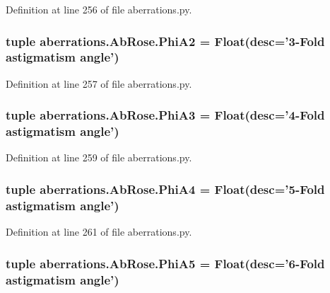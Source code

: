 Definition at line 256 of file aberrations.\-py.

\hypertarget{classaberrations_1_1_ab_rose_a69b11a8a41302834a847a94e4cd3c179}{
\subsubsection[{Phi\-A2}]{\setlength{\rightskip}{0pt plus 5cm}tuple aberrations.\-Ab\-Rose.\-Phi\-A2 = Float(desc='3-\/Fold astigmatism {\bf angle}')\hspace{0.3cm}{\ttfamily [static]}}}\label{classaberrations_1_1_ab_rose_a69b11a8a41302834a847a94e4cd3c179}


Definition at line 257 of file aberrations.\-py.

\hypertarget{classaberrations_1_1_ab_rose_a823c4123539f2644a44a89e11932c4d8}{
\subsubsection[{Phi\-A3}]{\setlength{\rightskip}{0pt plus 5cm}tuple aberrations.\-Ab\-Rose.\-Phi\-A3 = Float(desc='4-\/Fold astigmatism {\bf angle}')\hspace{0.3cm}{\ttfamily [static]}}}\label{classaberrations_1_1_ab_rose_a823c4123539f2644a44a89e11932c4d8}


Definition at line 259 of file aberrations.\-py.

\hypertarget{classaberrations_1_1_ab_rose_a19bbbad8124fe76e728a7fde8df1b692}{
\subsubsection[{Phi\-A4}]{\setlength{\rightskip}{0pt plus 5cm}tuple aberrations.\-Ab\-Rose.\-Phi\-A4 = Float(desc='5-\/Fold astigmatism {\bf angle}')\hspace{0.3cm}{\ttfamily [static]}}}\label{classaberrations_1_1_ab_rose_a19bbbad8124fe76e728a7fde8df1b692}


Definition at line 261 of file aberrations.\-py.

\hypertarget{classaberrations_1_1_ab_rose_a49e238bba2bbc2d2a278663640389e7c}{
\subsubsection[{Phi\-A5}]{\setlength{\rightskip}{0pt plus 5cm}tuple aberrations.\-Ab\-Rose.\-Phi\-A5 = Float(desc='6-\/Fold astigmatism {\bf angle}')\hspace{0.3cm}{\ttfamily [static]}}}\label{classaberrations_1_1_ab_rose_a49e238bba2bbc2d2a278663640389e7c}


